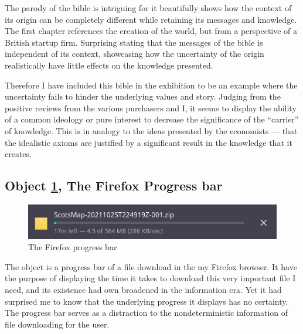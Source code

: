 \documentclass[a4paper,12pt]{article}
\begin{document}
The parody of the bible is intriguing for it beautifully shows how the context of its origin can be completely different while retaining its messages and knowledge. The first chapter references the creation of the world, but from a perspective of a British startup firm. Surprising stating that the messages of the bible is independent of its context, showcasing how the uncertainty of the origin realistically have little effects on the knowledge presented.

Therefore I have included this bible in the exhibition to be an example where the uncertainty fails to hinder the underlying values and story. Judging from the positive reviews from the various purchasers and I, it seems to display the ability of a common ideology or pure interest to decrease the significance of the ``carrier'' of knowledge. This is in analogy to the ideas presented by the economists --- that the idealistic axioms are justified by a significant result in the knowledge that it creates.




\subsection*{Object \ref{fig:download}, The Firefox Progress bar}

\begin{figure}[h!]
 \centering
 \includegraphics[scale=0.35]{progress.png}
 \caption{The Firefox progress bar}
 \label{fig:download}
\end{figure}


The object is a progress bar of a file download in the my Firefox browser. It have the purpose of displaying the time it takes to download this very important file I need, and its existence had own broadened in the information era. Yet it had surprised me to know that the underlying progress it displays has no certainty. The progress bar serves as a distraction to the nondeterministic information of file downloading for the user.
\end{document}
